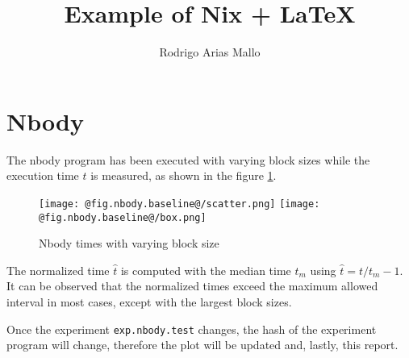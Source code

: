 \documentclass{article}
\begin{document}
\title{Example of Nix + \LaTeX{}}
\author{Rodrigo Arias Mallo}

\maketitle

\section{Nbody}
The nbody program has been executed with varying block sizes while the execution 
time $t$ is measured, as shown in the figure \ref{fig:nbody.test}.
%
\begin{figure}[h]
    \centering
		\texttt{[image: @fig.nbody.baseline@/scatter.png]}
		\texttt{[image: @fig.nbody.baseline@/box.png]}
		\caption{Nbody times with varying block size}
		\label{fig:nbody.test}
\end{figure}
%
The normalized time $\hat t$ is computed with the median time $t_m$ using $ \hat 
t = t / t_{m} - 1 $. It can be observed that the normalized times exceed the 
maximum allowed interval in most cases, except with the largest block sizes.

Once the experiment \texttt{exp.nbody.test} changes, the hash of the experiment 
program will change, therefore the plot will be updated and, lastly, this 
report.
\end{document}
